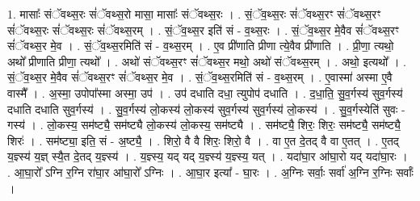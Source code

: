\documentclass[17pt]{extarticle}
\begin{document}
1. मासाः᳚ संॅवथ्स॒रः सं॑ॅवथ्स॒रो मासा॒ मासाः᳚ संॅवथ्स॒रः । . सं॒ॅव॒थ्स॒रः सं॑ॅवथ्स॒रꣳ सं॑ॅवथ्स॒रꣳ सं॑ॅवथ्स॒रः सं॑ॅवथ्स॒रः सं॑ॅवथ्स॒रम् । . सं॒ॅव॒थ्स॒र इति॑ सं - व॒थ्स॒रः । . सं॒ॅव॒थ्स॒र मे॒वैव सं॑ॅवथ्स॒रꣳ सं॑ॅवथ्स॒र मे॒व । . सं॒ॅव॒थ्स॒रमिति॑ सं - व॒थ्स॒रम् । . ए॒व प्री॑णाति प्रीणा त्ये॒वैव प्री॑णाति । . प्री॒णा॒ त्यथो॒ अथो᳚ प्रीणाति प्रीणा॒ त्यथो᳚ । . अथो॑ संॅवथ्स॒रꣳ सं॑ॅवथ्स॒र मथो॒ अथो॑ संॅवथ्स॒रम् । . अथो॒ इत्यथो᳚ । . सं॒ॅव॒थ्स॒र मे॒वैव सं॑ॅवथ्स॒रꣳ सं॑ॅवथ्स॒र मे॒व । . सं॒ॅव॒थ्स॒रमिति॑ सं - व॒थ्स॒रम् । . ए॒वास्मा॑ अस्मा ए॒वै वास्मै᳚ । . अ॒स्मा॒ उपोपा᳚स्मा अस्मा॒ उप॑ । . उप॑ दधाति दधा॒ त्युपोप॑ दधाति । . द॒धा॒ति॒ सु॒व॒र्गस्य॑ सुव॒र्गस्य॑ दधाति दधाति सुव॒र्गस्य॑ । . सु॒व॒र्गस्य॑ लो॒कस्य॑ लो॒कस्य॑ सुव॒र्गस्य॑ सुव॒र्गस्य॑ लो॒कस्य॑ । . सु॒व॒र्गस्येति॑ सुवः - गस्य॑ । . लो॒कस्य॒ सम॑ष्ट्यै॒ सम॑ष्ट्यै लो॒कस्य॑ लो॒कस्य॒ सम॑ष्ट्यै । . सम॑ष्ट्यै॒ शिरः॒ शिरः॒ सम॑ष्ट्यै॒ सम॑ष्ट्यै॒ शिरः॑ । . सम॑ष्ट्या॒ इति॒ सं - अ॒ष्ट्यै॒ । . शिरो॒ वै वै शिरः॒ शिरो॒ वै । . वा ए॒त दे॒तद् वै वा ए॒तत् । . ए॒तद् य॒ज्ञ्स्य॑ य॒ज्ञ् स्यै॒त दे॒तद् य॒ज्ञ्स्य॑ । . य॒ज्ञ्स्य॒ यद् यद् य॒ज्ञ्स्य॑ य॒ज्ञ्स्य॒ यत् । . यदा॑घा॒र आ॑घा॒रो यद् यदा॑घा॒रः । . आ॒घा॒रो᳚ ऽग्नि र॒ग्नि रा॑घा॒र आ॑घा॒रो᳚ ऽग्निः । . आ॒घा॒र इत्या᳚ - घा॒रः । . अ॒ग्निः सर्वाः॒ सर्वा॑ अ॒ग्नि र॒ग्निः सर्वाः᳚ । \newline
\end{document}

